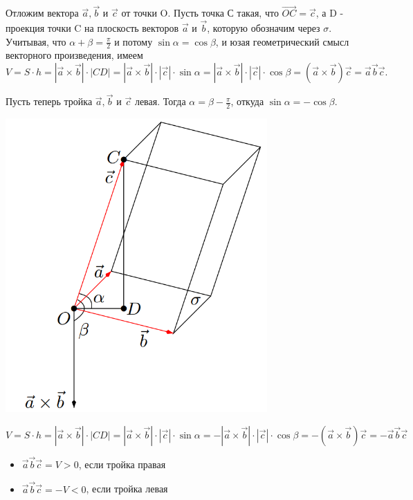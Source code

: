 \documentclass[a4paper]{article}
\begin{document}
{\begin{small}
Отложим вектора $\vec{a}, \vec{b}$ и $\vec{c}$ от точки O. Пусть точка С такая, что $\overrightarrow{OC} = \vec{c}$, а D - проекция точки C на плоскость векторов $\vec{a}$ и $\vec{b}$, которую обозначим через $\sigma$. Учитывая, что $\alpha + \beta = \frac{\pi}{2}$ и потому $\sin \alpha = \cos \beta$, и юзая геометрический смысл векторного произведения, имеем 
\begin{equation}
V = S \cdot h =  | \vec{a} \times \vec{b} | \cdot | CD | = |\vec{a} \times \vec{b}| \cdot | \vec{c} | \cdot \sin \alpha = |\vec{a} \times \vec{b}| \cdot | \vec{c} | \cdot \cos \beta = ( \vec{a} \times \vec{b}) \vec{c} = \vec{a} \vec{b} \vec{c}.
\end{equation}

Пусть теперь тройка $\vec{a}, \vec{b}$ и $\vec{c}$ левая. Тогда $\alpha = \beta - \frac{\pi}{2}$, откуда $\sin \alpha = - \cos \beta$.

\includegraphics[width=10cm]{t5}

\begin{equation}
V = S \cdot h = | \vec{a} \times \vec{b} | \cdot | CD | = | \vec{a} \times \vec{b} | \cdot | \vec{c} | \cdot \sin \alpha = - | \vec{a} \times \vec{b} | \cdot | \vec{c} | \cdot \cos \beta = - (\vec{a} \times \vec{b}) \vec{c} = -\vec{a} \vec{b} \vec{c}
\end{equation}

\begin{itemize}
\item $\vec{a} \vec{b} \vec{c} = V > 0$, если тройка правая
\item $\vec{a} \vec{b} \vec{c} = -V < 0$, если тройка левая
\end{itemize}



\end{small}}
\end{document}
